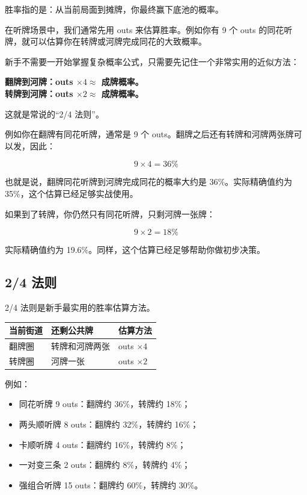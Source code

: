 胜率指的是：从当前局面到摊牌，你最终赢下底池的概率。

在听牌场景中，我们通常先用 outs 来估算胜率。例如你有 9 个 outs 的同花听牌，就可以估算你在转牌或河牌完成同花的大致概率。

新手不需要一开始掌握复杂概率公式，只需要先记住一个非常实用的近似方法：

\begin{center}
\textbf{翻牌到河牌：outs $\times 4 \approx$ 成牌概率。\\
转牌到河牌：outs $\times 2 \approx$ 成牌概率。}
\end{center}

这就是常说的“2/4 法则”。

例如你在翻牌有同花听牌，通常是 9 个 outs。翻牌之后还有转牌和河牌两张牌可以发，因此：

\[
9 \times 4 = 36\%
\]

也就是说，翻牌同花听牌到河牌完成同花的概率大约是 36\%。实际精确值约为 35\%，这个估算已经足够实战使用。

如果到了转牌，你仍然只有同花听牌，只剩河牌一张牌：

\[
9 \times 2 = 18\%
\]

实际精确值约为 19.6\%。同样，这个估算已经足够帮助你做初步决策。

\subsection{2/4 法则}

2/4 法则是新手最实用的胜率估算方法。

\begin{center}
\begin{tabular}{lll}
\toprule
\textbf{当前街道} & \textbf{还剩公共牌} & \textbf{估算方法} \\
\midrule
翻牌圈 & 转牌和河牌两张 & outs $\times 4$ \\
转牌圈 & 河牌一张 & outs $\times 2$ \\
\bottomrule
\end{tabular}
\end{center}

例如：

\begin{itemize}
\item 同花听牌 9 outs：翻牌约 36\%，转牌约 18\%；
\item 两头顺听牌 8 outs：翻牌约 32\%，转牌约 16\%；
\item 卡顺听牌 4 outs：翻牌约 16\%，转牌约 8\%；
\item 一对变三条 2 outs：翻牌约 8\%，转牌约 4\%；
\item 强组合听牌 15 outs：翻牌约 60\%，转牌约 30\%。
\end{itemize}


